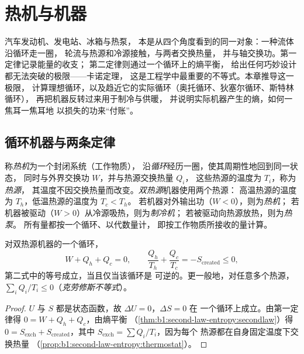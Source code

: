 \chapter{热机与机器}\label{ch:b1:heat-engines}

汽车发动机、发电站、冰箱与热泵，
本是从四个角度看到的同一对象：一种流体沿循环走一圈，
轮流与热源和冷源接触，与两者交换热量，
并与轴交换功。第一定律记录能量的收支；
第二定律则通过一个循环上的熵平衡，
给出任何巧妙设计都无法突破的极限——卡诺定理，
这是工程学中最重要的不等式。本章推导这一极限，
计算理想循环，以及趋近它的实际循环（奥托循环、狄塞尔循环、斯特林循环），
再把机器反转过来用于制冷与供暖，
并说明实际机器产生的熵，如何一焦耳一焦耳地
以损失的功来“付账”。

\section{循环机器与两条定律}

\begin{definition}[热机]\label{def:b1:heat-engines:machine}
称\emph{热机}为一个封闭系统（工作物质），
沿\emph{循环}经历一圈，使其周期性地回到同一状态，
同时与外界交换功 $W$，并与热源交换热量 $Q_i$，
这些热源的温度为 $T_i$，称为\emph{热源}，
其温度不因交换热量而改变。\emph{双热源}机器使用两个热源：
高温热源的温度为 $T_h$，低温热源的温度为 $T_c < T_h$。
若机器对外输出功（$W < 0$），则为\emph{热机}；
若机器被驱动（$W > 0$）从冷源吸热，则为\emph{制冷机}；
若被驱动向热源放热，则为\emph{热泵}。
所有量都按一个循环、以代数量计，
即按工作物质所接收的量计算。
\end{definition}

\begin{theorem}\label{thm:b1:heat-engines:clausius}
对双热源机器的一个循环，
\[
W + Q_h + Q_c = 0 , \qquad
\frac{Q_h}{T_h} + \frac{Q_c}{T_c} = -S_{\mathrm{created}} \leq 0 ,
\]
第二式中的等号成立，当且仅当该循环是
可逆的。更一般地，对任意多个热源，
$\sum_i Q_i/T_i \leq 0$（\emph{克劳修斯不等式}）。
\end{theorem}

\begin{proof}
$U$ 与 $S$ 都是状态函数，故 $\Delta U = 0$，$\Delta S = 0$ 在
一个循环上成立。由第一定律得 $0 = W + Q_h + Q_c$，由熵平衡
（\cref{thm:b1:second-law-entropy:secondlaw}）得 $0 = S_{\mathrm{exch}} +
S_{\mathrm{created}}$，其中 $S_{\mathrm{exch}} = \sum Q_i/T_i$，因为每个
热源都在自身固定温度下交换热量
（\cref{prop:b1:second-law-entropy:thermostat}）。
\end{proof}

